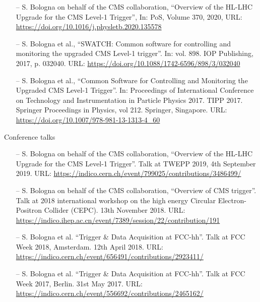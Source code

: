 \documentclass[10pt,a4paper]{altacv}
\begin{document}
\begin{itemize}
    \item[--] S. Bologna on behalf of the CMS collaboration, ``Overview of the HL-LHC Upgrade for the CMS Level-1 Trigger'', In: PoS, Volume 370, 2020, URL: \url{https://doi.org/10.1016/j.physletb.2020.135578}
    \item[--] S. Bologna et al., ``SWATCH: Common software for controlling and monitoring the upgraded CMS Level-1 trigger''. In: vol. 898. IOP Publishing, 2017, p. 032040. URL: \url{https://doi.org/10.1088/1742-6596/898/3/032040}
    \item[--] S. Bologna et al., ``Common Software for Controlling and Monitoring the Upgraded CMS Level-1 Trigger''. In: Proceedings of International Conference on Technology and Instrumentation in Particle Physics 2017. TIPP 2017. Springer Proceedings in Physics, vol 212. Springer, Singapore. URL: \url{https://doi.org/10.1007/978-981-13-1313-4_60}

\end{itemize}

\medskip

{\large\color{emphasis}Conference talks\par}

\medskip

\begin{itemize}
  \item[--] S. Bologna on behalf of the CMS collaboration, ``Overview of the HL-LHC Upgrade for the CMS Level-1 Trigger''. Talk at TWEPP 2019, 4th September 2019.
    URL: \url{https://indico.cern.ch/event/799025/contributions/3486499/}
  \item[--] S. Bologna on behalf of the CMS collaboration, ``Overview of CMS trigger''. Talk at 2018 international workshop on the high energy Circular Electron-Positron Collider (CEPC). 13th November 2018. 
    URL: \url{https://indico.ihep.ac.cn/event/7389/session/22/contribution/191}
  \item[--] S. Bologna et al. ``Trigger \& Data Acquisition at FCC-hh''. Talk at FCC Week 2018, Amsterdam. 12th April 2018. 
    URL: \url{https://indico.cern.ch/event/656491/contributions/2923411/}
  \item[--] S. Bologna et al. ``Trigger \& Data Acquisition at FCC-hh''. Talk at FCC Week 2017, Berlin. 31st May 2017. 
    URL: \url{https://indico.cern.ch/event/556692/contributions/2465162/}
\end{itemize}

\medskip
\end{document}
